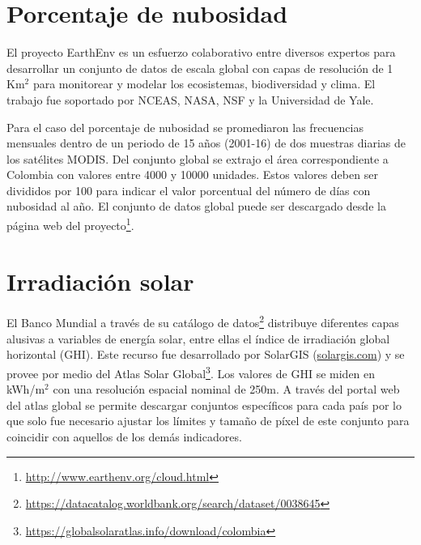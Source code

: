 \section{Porcentaje de nubosidad}

El proyecto EarthEnv \cite{wilson_remotely_2016}  es un esfuerzo colaborativo entre diversos expertos para desarrollar un conjunto de datos de escala global con 
capas de resolución de 1 Km$^2$ para monitorear y modelar los ecosistemas, biodiversidad y clima.  El trabajo fue soportado por NCEAS, NASA, NSF y la 
Universidad de Yale.  

Para el caso del porcentaje de nubosidad se promediaron las frecuencias mensuales dentro de un periodo de 15 años (2001-16) de dos muestras diarias de los 
satélites MODIS.  Del conjunto global se extrajo el área correspondiente a Colombia con valores entre 4000 y 10000 unidades.  Estos valores deben ser divididos 
por 100 para indicar el valor porcentual del número de días con nubosidad al año.  El conjunto de datos global puede ser descargado desde la página web del 
proyecto\footnote{\url{http://www.earthenv.org/cloud.html}}.

\section{Irradiación solar}

El Banco Mundial a través de su catálogo de datos\footnote{\url{https://datacatalog.worldbank.org/search/dataset/0038645}} distribuye diferentes capas alusivas 
a variables de energía solar, entre ellas el índice de irradiación global horizontal (GHI).  Este recurso fue desarrollado por SolarGIS 
(\href{https://solargis.com}{solargis.com}) y se provee por medio del Atlas Solar Global\footnote{\url{https://globalsolaratlas.info/download/colombia}}.  Los 
valores de GHI se miden en kWh/m$^2$ con una resolución espacial nominal de 250m.  A través del portal web del atlas global se permite descargar conjuntos 
específicos para cada país por lo que solo fue necesario ajustar los límites y tamaño de píxel de este conjunto para coincidir con aquellos de los demás 
indicadores.
